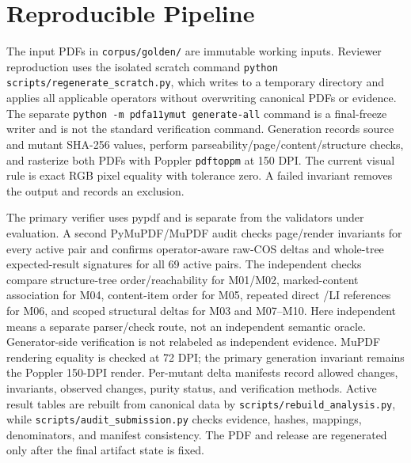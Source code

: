 \documentclass[conference]{IEEEtran}
\newcommand{\taggedsection}[1]{%
  \tagstructbegin{tag=H1}\tagmcbegin{tag=H1}\section{#1}\tagmcend\tagstructend}
\newenvironment{taggedparagraph}{%
  \tagstructbegin{tag=P}\tagmcbegin{tag=P}%
}{%
  \tagmcend\tagstructend%
}
\begin{document}
\taggedsection{Reproducible Pipeline}
\begin{taggedparagraph}
The input PDFs in \texttt{corpus/golden/} are immutable working inputs. Reviewer reproduction uses the isolated scratch command \texttt{python scripts/regenerate\_scratch.py}, which writes to a temporary directory and applies all applicable operators without overwriting canonical PDFs or evidence. The separate \texttt{python -m pdfa11ymut generate-all} command is a final-freeze writer and is not the standard verification command. Generation records source and mutant SHA-256 values, perform parseability/page/content/structure checks, and rasterize both PDFs with Poppler \texttt{pdftoppm} at 150 DPI. The current visual rule is exact RGB pixel equality with tolerance zero. A failed invariant removes the output and records an exclusion.
\end{taggedparagraph}

\begin{taggedparagraph}
The primary verifier uses pypdf and is separate from the validators under evaluation. A second PyMuPDF/MuPDF audit checks page/render invariants for every active pair and confirms operator-aware raw-COS deltas and whole-tree expected-result signatures for all 69 active pairs. The independent checks compare structure-tree order/reachability for M01/M02, marked-content association for M04, content-item order for M05, repeated direct /LI references for M06, and scoped structural deltas for M03 and M07--M10. Here independent means a separate parser/check route, not an independent semantic oracle. Generator-side verification is not relabeled as independent evidence. MuPDF rendering equality is checked at 72 DPI; the primary generation invariant remains the Poppler 150-DPI render. Per-mutant delta manifests record allowed changes, invariants, observed changes, purity status, and verification methods. Active result tables are rebuilt from canonical data by \texttt{scripts/rebuild\_analysis.py}, while \texttt{scripts/audit\_submission.py} checks evidence, hashes, mappings, denominators, and manifest consistency. The PDF and release are regenerated only after the final artifact state is fixed.
\end{taggedparagraph}
\end{document}
